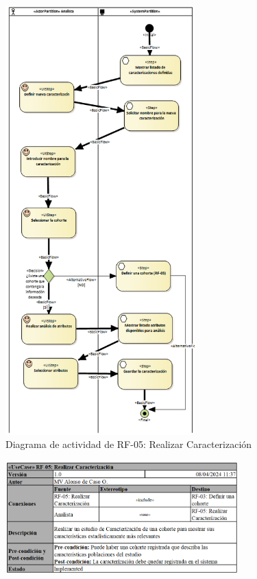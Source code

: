 \begin{figure}[H]
    \centering
    \includegraphics[width=0.65\textwidth]{figures/FR05.png}
    \caption{Diagrama de actividad de RF-05: Realizar Caracterización}
    \label{fig:FR05}
\end{figure}

\begin{figure}[H]
    \centering
    \includegraphics[width=0.80\textwidth]{tables/RF05tab.png}
    \label{table:RF05tab}
\end{figure}

